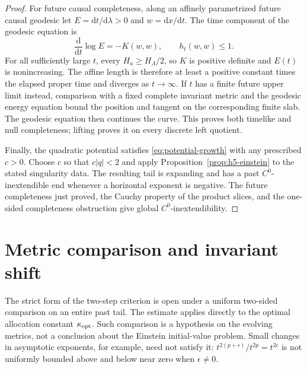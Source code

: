 \documentclass[10pt,a4paper]{article}
\numberwithin{equation}{section}
\theoremstyle{definition}
\theoremstyle{remark}
\newcommand{\dd}{\mathrm d}
\begin{document}
\begin{proof}
For future causal completeness, along an affinely parametrized
future causal geodesic let $E=\dd t/\dd\lambda>0$ and
$w=\dd x/\dd t$.  The time component of the geodesic equation is
\[
 \frac{\dd}{\dd t}\log E=-K(w,w),\qquad h_t(w,w)\le1.
\]
For all sufficiently large $t$, every $H_a\ge H_\Lambda/2$, so
$K$ is positive definite and $E(t)$ is nonincreasing.  The affine
length is therefore at least a positive constant times the elapsed
proper time and diverges as $t\to\infty$.
If $t$ has a finite future upper limit instead, comparison with a
fixed complete invariant metric and the geodesic energy equation
bound the position and tangent on the corresponding finite slab.
The geodesic equation then continues the curve.  This proves both
timelike and null completeness; lifting proves it on every discrete
left quotient.

Finally, the quadratic potential satisfies
\eqref{eq:potential-growth} with any prescribed $c>0$.
Choose $c$ so that $c|q|<2$ and apply
Proposition~\ref{prop:h5-einstein} to the stated singularity data.
The resulting tail is expanding and has a past
$C^0$-inextendible end whenever a horizontal exponent is negative.
The future completeness just proved, the Cauchy property of the
product slices, and the one-sided completeness obstruction
\cite{GLS2018} give global $C^0$-inextendibility.
\end{proof}

\section{Metric comparison and invariant shift}
\label{sec:stability}

The strict form of the two-step criterion is open under a uniform
two-sided comparison on an entire past tail.  The estimate applies
directly to the optimal allocation constant $\kappa_{\rm opt}$.
Such comparison is a hypothesis on the evolving metrics, not a conclusion
about the Einstein initial-value problem.  Small changes in asymptotic
exponents, for example, need not satisfy it:
$t^{2(p+\epsilon)}/t^{2p}=t^{2\epsilon}$ is not uniformly bounded above
and below near zero when $\epsilon\ne0$.
\end{document}
